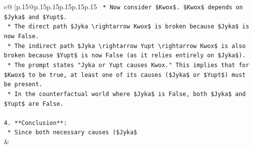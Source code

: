 \documentclass{article}
\begin{document}
{\begin{supertabular}{c@{$\;$}|p{.15\linewidth}@{}p{.15\linewidth}p{.15\linewidth}p{.15\linewidth}p{.15\linewidth}p{.15\linewidth}}
{{{\texttt{    *   Now consider \$Kwox\$. \$Kwox\$ depends on \$Jyka\$ and \$Yupt\$.} \\
\texttt{        *   The direct path \$Jyka \textbackslash{}rightarrow Kwox\$ is broken because \$Jyka\$ is now False.} \\
\texttt{        *   The indirect path \$Jyka \textbackslash{}rightarrow Yupt \textbackslash{}rightarrow Kwox\$ is also broken because \$Yupt\$ is now False (as it relies entirely on \$Jyka\$).} \\
\texttt{    *   The prompt states "Jyka or Yupt causes Kwox." This implies that for \$Kwox\$ to be true, at least one of its causes (\$Jyka\$ or \$Yupt\$) must be present.} \\
\texttt{    *   In the counterfactual world where \$Jyka\$ is False, both \$Jyka\$ and \$Yupt\$ are False.} \\
\\ 
\texttt{4.  **Conclusion**:} \\
\texttt{    *   Since both necessary causes (\$Jyka\$} \\
            }
        }
    }
    & \\ \\


\end{supertabular}}
\end{document}
